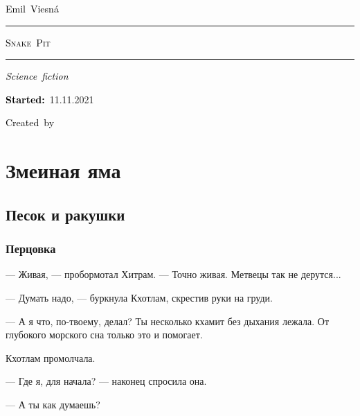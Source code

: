 \documentclass[a4paper,10pt,fleqn]{book}\usepackage{cooltooltips}\usepackage{polyglossia}\setdefaultlanguage{english}\setotherlanguage{russian}\defaultfontfeatures{Ligatures=TeX,Mapping=tex-text} \usepackage{xcolor}\definecolor{lightgray}{HTML}{bbbbbb}\color{lightgray}\newcommand{\ml}[3]{\textcolor{black}{#3}}
\newcommand{\tofaauthor}{\ml{$0$}{Эмиль~Весна}{Emil~Viesn\'{a}}}
\newcommand{\tofatitle}{\ml{$0$}{ЗМЕИНАЯ~ЯМА}{Snake~Pit}}
\newcommand{\tofastarted}{11.11.2021}
\newcommand{\asterism}{\vspace{1em}{\centering\Large\bfseries$\ast~\ast~\ast$\par}\vspace{1em}}
\begin{document}

\begin{titlepage}
{\centering{~\par}\vspace{0.25\textheight}
{\LARGE\tofaauthor}\par
\vspace{1.0cm}\rule{17em}{1pt}\par\vspace{0.3cm}
{\Huge\textsc{\tofatitle}\par}
\vspace{0.3cm}\rule{17em}{2pt}\par\vspace{1.0cm}
{\Large\textit{\ml{$0$}{Фантастический~роман}{Science~fiction}}\par}
\vspace{0.5cm}\asterism\par\vspace{1.0cm}
{\textbf{\ml{$0$}{Начато:}{Started:}}~\tofastarted\par}\vfill
{\Large\ml{$0$}{Создано~в}{Created~by}~\XeLaTeX}\par}
\end{titlepage}

\tableofcontents

\part{Змеиная яма}

\chapter{Песок и ракушки}

\section{Перцовка}

--- Живая, --- пробормотал Хитрам.
--- Точно живая.
Метвецы так не дерутся...

--- Думать надо, --- буркнула Кхотлам, скрестив руки на груди.

--- А я что, по-твоему, делал?
Ты несколько кхамит без дыхания лежала.
От глубокого морского сна только это и помогает.

Кхотлам промолчала.

--- Где я, для начала? --- наконец спросила она.

--- А ты как думаешь?
\end{document}
